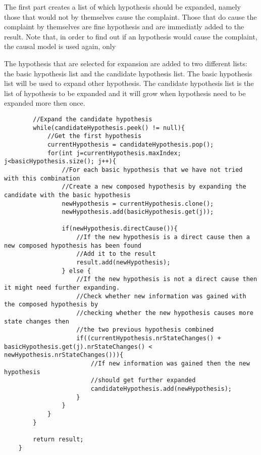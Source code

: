 \documentclass[a4paper,10pt]{article}
\begin{document}
The first part creates a list of which hypothesis should be expanded, namely those that would not by themselves cause the complaint. Those that do cause the complaint by themselves are fine hypothesis and are immediatly added to the result. Note that, in order to find out if an hypothesis would cause the complaint, the causal model is used again, only 

The hypothesis that are selected for expansion are added to two different lists: the basic hypothesis list and the candidate hypothesis list. The basic hypothesis list will be used to expand other hypothesis. The candidate hypothesis list is the list of hypothesis to be expanded and it will grow when  hypothesis need to be expanded more then once.

\begin{verbatim}
        //Expand the candidate hypothesis
        while(candidateHypothesis.peek() != null){
            //Get the first hypothesis
            currentHypothesis = candidateHypothesis.pop();
            for(int j=currentHypothesis.maxIndex; j<basicHypothesis.size(); j++){
                //For each basic hypothesis that we have not tried with this combination
                //Create a new composed hypothesis by expanding the candidate with the basic hypothesis
                newHypothesis = currentHypothesis.clone();
                newHypothesis.add(basicHypothesis.get(j));

                if(newHypothesis.directCause()){
                    //If the new hypothesis is a direct cause then a new composed hypothesis has been found
                    //Add it to the result
                    result.add(newHypothesis);
                } else {
                    //If the new hypothesis is not a direct cause then it might need further expanding.
                    //Check whether new information was gained with the composed hypothesis by
                    //checking whether the new hypothesis causes more state changes then
                    //the two previous hypothesis combined
                    if((currentHypothesis.nrStateChanges() + basicHypothesis.get(j).nrStateChanges() < newHypothesis.nrStateChanges())){
                        //If new information was gained then the new hypothesis
                        //should get further expanded
                        candidateHypothesis.add(newHypothesis);
                    }
                }
            }
        }

        return result;
    }

\end{verbatim}
\end{document}
